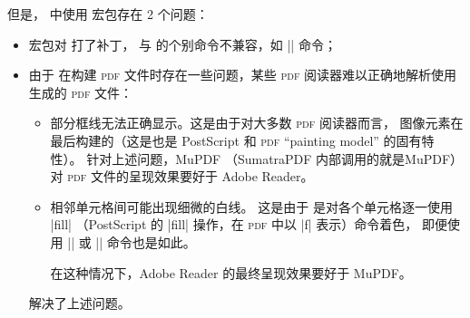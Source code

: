 \documentclass[dvipsnames]{article}%
\begin{document}
\medskip
但是，  中使用  宏包存在 2 个问题：
\begin{itemize}
\item {} 宏包对  打了补丁，
与  的个别命令不兼容，如 |\hdotsfor| 命令；

\item 由于  在构建 \textsc{pdf} 文件时存在一些问题，某些 \textsc{pdf} 阅读器难以正确地解析使用  生成的 \textsc{pdf} 文件：
\begin{itemize}
\item 部分框线无法正确显示。这是由于对大多数 \textsc{pdf} 阅读器而言，
图像元素在最后构建的（这是也是 PostScript 和 \textsc{pdf} ``painting model'' 的固有特性）。
针对上述问题，MuPDF （SumatraPDF 内部调用的就是MuPDF）对 \textsc{pdf} 文件的呈现效果要好于 Adobe Reader。
\item 相邻单元格间可能出现细微的白线。
这是由于  是对各个单元格逐一使用 |fill| （PostScript 的 |fill| 操作，在 \textsc{pdf} 中以 |f| 表示）命令着色，
即便使用 |\columncolor| 或
|\rowcolor| 命令也是如此。

在这种情况下，Adobe Reader 的最终呈现效果要好于 MuPDF。
\end{itemize}

  解决了上述问题。
\end{itemize}
\end{document}
